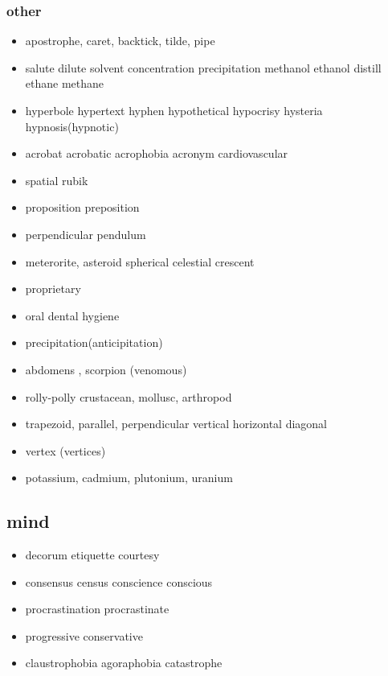 \documentclass[a4paper,11pt,twoside]{book}
\begin{document}
\subsubsection{other}  

\begin{itemize}

	\item apostrophe, caret, backtick, tilde, pipe

	\item salute dilute solvent concentration precipitation methanol ethanol distill  ethane methane
	
	\item hyperbole hypertext hyphen hypothetical hypocrisy hysteria hypnosis(hypnotic)
	
	\item acrobat acrobatic acrophobia acronym cardiovascular
	
	\item spatial rubik
	
	\item proposition preposition
	
	\item perpendicular pendulum
	
	\item meterorite, asteroid spherical celestial crescent
	
	\item proprietary
	
	\item oral dental hygiene
	
	\item precipitation(anticipitation)
	
	\item abdomens , scorpion (venomous)
	
	\item rolly-polly crustacean, mollusc, arthropod
	
	\item trapezoid, parallel, perpendicular vertical horizontal diagonal
	
	\item vertex (vertices)
	
	\item potassium, cadmium, plutonium, uranium
	
\end{itemize}

\subsection{mind}
\begin{itemize}
	\item decorum etiquette courtesy
	
 	\item consensus census conscience conscious
 
	\item procrastination procrastinate
	
	\item progressive conservative  
	
	\item claustrophobia agoraphobia catastrophe
\end{itemize}
\end{document}
